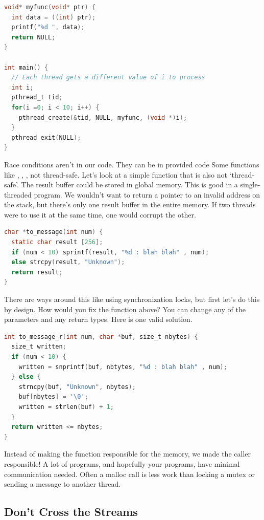 \begin{lstlisting}[language=C]
void* myfunc(void* ptr) {
  int data = ((int) ptr);
  printf("%d ", data);
  return NULL;
}

int main() {
  // Each thread gets a different value of i to process
  int i;
  pthread_t tid;
  for(i =0; i < 10; i++) {
    pthread_create(&tid, NULL, myfunc, (void *)i);
  }
  pthread_exit(NULL);
}
\end{lstlisting}

Race conditions aren't in our code.
They can be in provided code
Some functions like , , ,  not thread-safe.
Let's look at a simple function that is also not `thread-safe'.
The result buffer could be stored in global memory.
This is good in a single-threaded program.
We wouldn't want to return a pointer to an invalid address on the stack, but there's only one result buffer in the entire memory.
If two threads were to use it at the same time, one would corrupt the other.

\begin{lstlisting}[language=C]
char *to_message(int num) {
  static char result [256];
  if (num < 10) sprintf(result, "%d : blah blah" , num);
  else strcpy(result, "Unknown");
  return result;
}
\end{lstlisting}

There are ways around this like using synchronization locks, but first let's do this by design.
How would you fix the function above?
You can change any of the parameters and any return types.
Here is one valid solution.

\begin{lstlisting}[language=C]
int to_message_r(int num, char *buf, size_t nbytes) {
  size_t written;
  if (num < 10) {
    written = snprintf(buf, nbtytes, "%d : blah blah" , num);
  } else {
    strncpy(buf, "Unknown", nbytes);
    buf[nbytes] = '\0';
    written = strlen(buf) + 1;
  }
  return written <= nbytes;
}
\end{lstlisting}

Instead of making the function responsible for the memory, we made the caller responsible!
A lot of programs, and hopefully your programs, have minimal communication needed.
Often a malloc call is less work than locking a mutex or sending a message to another thread.

\subsection{Don't Cross the Streams}

